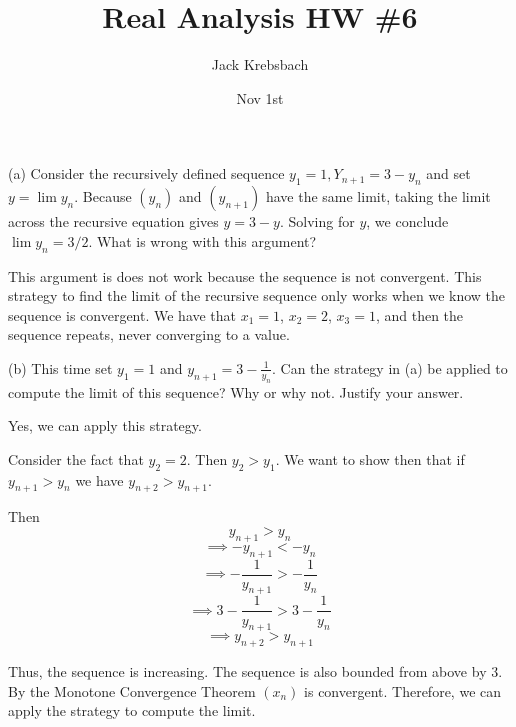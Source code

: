 \documentclass{report}
\title{Real Analysis HW \#6}
\author{Jack Krebsbach }
\date{Nov 1st}
\begin{document}
\maketitle


(a) Consider the recursively defined sequence $y_1=1, Y_{n+1}=3-y_n$ and set $y=\lim y_n$. Because $\left(y_n\right)$ and $\left(y_{n+1}\right)$ have the same limit, taking the limit across the recursive equation gives $y=3-y$. Solving for $y$, we conclude $\lim y_n=3 / 2$. What is wrong with this argument?

\bigskip
\sol

This argument is does not work because the sequence is not convergent. This strategy to find the limit of the recursive sequence only works when we know the sequence is convergent. We have that $x_1 = 1$, $x_2 = 2$, $x_3 = 1$, and then the sequence repeats, never converging to a value.

\bigskip

\bigskip
(b) This time set $y_1=1$ and $y_{n+1}=3-\frac{1}{y_n}$. Can the strategy in (a) be applied to compute the limit of this sequence? Why or why not. Justify your answer.

\bigskip
\sol 

Yes, we can apply this strategy. 

Consider the fact that $y_2 = 2$. Then $y_2 > y_1$. We want to show then that if $y_{n+1} > y_{n}$ we have $y_{n+2} > y_{n+1}$. 

Then
$$y_{n+1}>y_n $$ $$ \implies -y_{n+1}<-y_{n} $$ $$ \implies-\frac{1}{y_{n+1}}>-\frac{1}{y_n} $$ $$ \implies3-\frac{1}{y_{n+1}}>3-\frac{1}{y_n} $$ $$ \implies y_{n+2}>y_{n+1}$$

Thus, the sequence is increasing. The sequence is also bounded from above by 3. By the Monotone Convergence Theorem $(x_n)$ is convergent. Therefore, we can apply the strategy to compute the limit.


\bigskip
\bigskip

\end{document}
